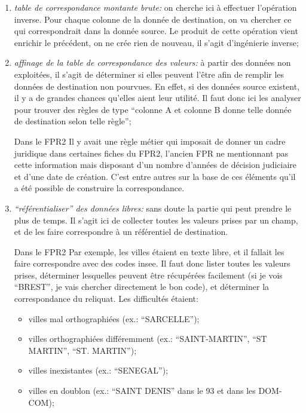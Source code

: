 \documentclass{book}
\begin{document}
\begin{enumerate}
\begin{itemize}
 \end{itemize}
 \item \textit{table de correspondance montante brute:} on cherche ici à effectuer l'opération inverse. Pour chaque colonne de la donnée de destination, on va chercher ce qui correspondrait dans la donnée source. Le produit de cette opération vient enrichir le précédent, on ne crée rien de nouveau, il s'agit d'ingénierie inverse;
 \item \textit{affinage de la table de correspondance des valeurs:} à partir des données non exploitées, il s'agit de déterminer si elles peuvent l'être afin de remplir les données de destination non pourvues. En effet, si des données source existent, il y a de grandes chances qu'elles aient leur utilité. Il faut donc ici les analyser pour trouver des règles de type ``colonne A et colonne B donne telle donnée de destination selon telle règle'';
  \begin{bclogo}[arrondi = 0.1, couleur = blue!10, logo = \bcinfo]{Dans le FPR2}
Il y avait une règle métier qui imposait de donner un cadre juridique dans certaines fiches du FPR2, l'ancien FPR ne mentionnant pas cette information mais disposant d'un nombre d'années de décision judiciaire et d'une date de création. C'est entre autres sur la base de ces éléments qu'il a été possible de construire la correspondance.
 \end{bclogo}
 \item \textit{``référentialiser'' des données libres:} sans doute la partie qui peut prendre le plus de temps. Il s'agit ici de collecter toutes les valeurs prises par un champ, et de les faire correspondre à un référentiel de destination.
 \begin{bclogo}[arrondi = 0.1, couleur = blue!10, logo = \bcinfo]{Dans le FPR2}
Par exemple, les villes étaient en texte libre, et il fallait les faire correspondre avec des codes \gls{insee}. Il faut donc lister toutes les valeurs prises, déterminer lesquelles peuvent être récupérées facilement (si je vois ``BREST'', je vais chercher directement le bon code), et déterminer la correspondance du reliquat. Les difficultés étaient:
 \begin{itemize}
  \item villes mal orthographiées (ex.: ``SARCELLE'');
  \item villes orthographiées différemment (ex.: ``SAINT-MARTIN'', ``ST MARTIN'', ``ST. MARTIN'');
  \item villes inexistantes (ex.: ``SENEGAL'');
  \item villes en doublon (ex.: ``SAINT DENIS'' dans le 93 et dans les DOM-COM);

\end{itemize}
\end{bclogo}
\end{enumerate}
\end{document}
